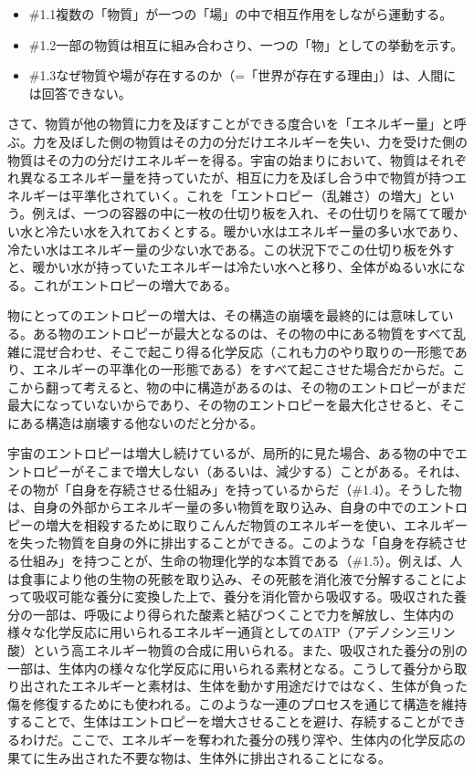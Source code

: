 \begin{note}{}
  \begin{itemize}
    \tightlist
    \item{\#1.1}複数の「物質」が一つの「場」の中で相互作用をしながら運動する。
    \item{\#1.2}一部の物質は相互に組み合わさり、一つの「物」としての挙動を示す。
    \item{\#1.3}なぜ物質や場が存在するのか（=「世界が存在する理由」）は、人間には回答できない。
  \end{itemize}
\end{note}

さて、物質が他の物質に力を及ぼすことができる度合いを「エネルギー量」と呼ぶ。力を及ぼした側の物質はその力の分だけエネルギーを失い、力を受けた側の物質はその力の分だけエネルギーを得る。宇宙の始まりにおいて、物質はそれぞれ異なるエネルギー量を持っていたが、相互に力を及ぼし合う中で物質が持つエネルギーは平準化されていく。これを「エントロピー（乱雑さ）の増大」という。例えば、一つの容器の中に一枚の仕切り板を入れ、その仕切りを隔てて暖かい水と冷たい水を入れておくとする。暖かい水はエネルギー量の多い水であり、冷たい水はエネルギー量の少ない水である。この状況下でこの仕切り板を外すと、暖かい水が持っていたエネルギーは冷たい水へと移り、全体がぬるい水になる。これがエントロピーの増大である。

物にとってのエントロピーの増大は、その構造の崩壊を最終的には意味している。ある物のエントロピーが最大となるのは、その物の中にある物質をすべて乱雑に混ぜ合わせ、そこで起こり得る化学反応（これも力のやり取りの一形態であり、エネルギーの平準化の一形態である）をすべて起こさせた場合だからだ。ここから翻って考えると、物の中に構造があるのは、その物のエントロピーがまだ最大になっていないからであり、その物のエントロピーを最大化させると、そこにある構造は崩壊する他ないのだと分かる。

宇宙のエントロピーは増大し続けているが、局所的に見た場合、ある物の中でエントロピーがそこまで増大しない（あるいは、減少する）ことがある。それは、その物が「自身を存続させる仕組み」を持っているからだ（\#1.4）。そうした物は、自身の外部からエネルギー量の多い物質を取り込み、自身の中でのエントロピーの増大を相殺するために取りこんんだ物質のエネルギーを使い、エネルギーを失った物質を自身の外に排出することができる。このような「自身を存続させる仕組み」を持つことが、生命の物理化学的な本質である（\#1.5）。例えば、人は食事により他の生物の死骸を取り込み、その死骸を消化液で分解することによって吸収可能な養分に変換した上で、養分を消化管から吸収する。吸収された養分の一部は、呼吸により得られた酸素と結びつくことで力を解放し、生体内の様々な化学反応に用いられるエネルギー通貨としてのATP（アデノシン三リン酸）という高エネルギー物質の合成に用いられる。また、吸収された養分の別の一部は、生体内の様々な化学反応に用いられる素材となる。こうして養分から取り出されたエネルギーと素材は、生体を動かす用途だけではなく、生体が負った傷を修復するためにも使われる。このような一連のプロセスを通じて構造を維持することで、生体はエントロピーを増大させることを避け、存続することができるわけだ。ここで、エネルギーを奪われた養分の残り滓や、生体内の化学反応の果てに生み出された不要な物は、生体外に排出されることになる。

